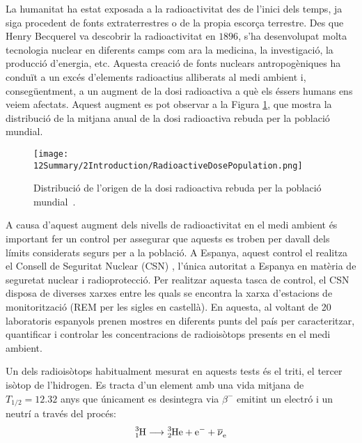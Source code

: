 La humanitat ha estat exposada a la radioactivitat des de l'inici dels temps, ja siga procedent de fonts extraterrestres o de la propia escorça terrestre. Des que Henry Becquerel va descobrir la radioactivitat en $1896$, s'ha desenvolupat molta tecnologia nuclear en diferents camps com ara la medicina, la investigació, la producció d'energia, etc. Aquesta creació de fonts nuclears antropogèniques ha conduït a un excés d'elements radioactius alliberats al medi ambient i, consegüentment, a un augment de la dosi radioactiva a què els éssers humans ens veiem afectats. Aquest augment es pot observar a la Figura  \ref{fig:DosiRadioactiva}, que mostra la distribució de la mitjana anual de la dosi radioactiva rebuda per la població mundial.

\begin{figure}[h]
\texttt{[image: 12Summary/2Introduction/RadioactiveDosePopulation.png]}
\centering
\caption{Distribució de l'origen de la dosi radioactiva rebuda per la població mundial~\cite{IAEA}\label{fig:DosiRadioactiva}.}
\end{figure}

A causa d'aquest augment dels nivells de radioactivitat en el medi ambient és important fer un control per assegurar que aquests es troben per davall dels límits considerats segurs per a la població. A Espanya, aquest control el realitza el Consell de Seguritat Nuclear (CSN) \cite{CSN}, l'única autoritat a Espanya en matèria de seguretat nuclear i radioprotecció. Per realitzar aquesta tasca de control, el CSN disposa de diverses xarxes entre les quals se encontra la xarxa d'estacions de monitorització (REM per les sigles en castellà). En aquesta, al voltant de 20 laboratoris espanyols prenen mostres en diferents punts del país per caracteritzar, quantificar i controlar les concentracions de radioisòtops presents en el medi ambient.

Un dels radioisòtops habitualment mesurat en aquests tests és el triti, el tercer isòtop de l'hidrogen. Es tracta d'un element amb una vida mitjana de $T_{1/2} = 12.32$ anys que únicament es desintegra via $\beta^{-}$ emitint un electró i un neutrí a través del procés:
\begin{equation}
\ce{^{3}_{1}H} \longrightarrow \ce{^{3}_{2}He}  + \ce{e^-}  + \ce{\overline{\nu}_e}
\label{eq:DecaimentTriti}
\end{equation}

